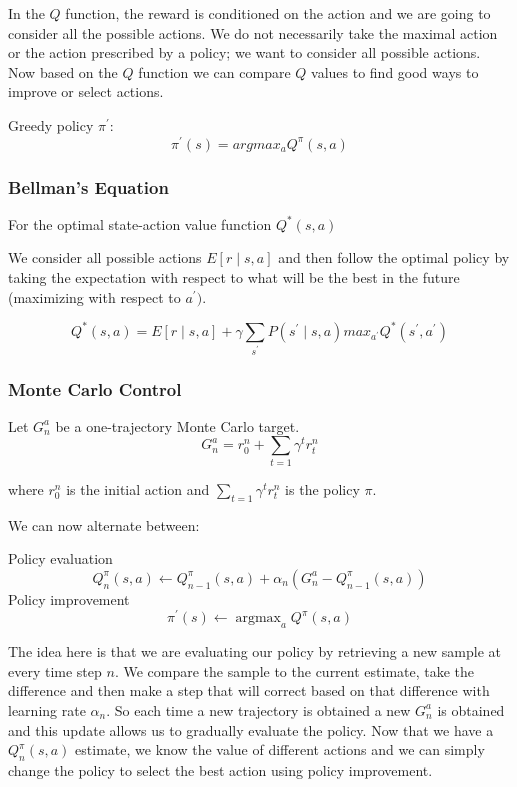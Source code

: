 \documentclass[12pt]{article}
\begin{document}
        In the $Q$ function, the reward is conditioned on the action and we are going to consider all the possible
        actions. We do not necessarily take the maximal action or the action prescribed by a policy; we want to consider
        all possible actions. Now based on the $Q$ function we can compare $Q$ values to find good ways to improve or
        select actions. 

        Greedy policy $\pi^{\prime}$:
        $$ \pi^{\prime}(s) = argmax_a Q^{\pi}(s,a) $$

        \subsubsection{Bellman's Equation}
            For the optimal state-action value function $Q^*(s, a)$ 

            We consider all possible actions $E[r \mid s, a]$ and then follow the optimal policy by taking the
            expectation with respect to what will be the best in the future (maximizing with respect to $a^{\prime})$.

            $$ Q^*(s, a) = E[r \mid s, a] + \gamma \sum_{s^{\prime}} P(s^{\prime} \mid s, a) max_{a^{\prime}}
            Q^*(s^{\prime}, a^{\prime}) $$
        
        \subsubsection{Monte Carlo Control}
            Let $G^a_n$ be a one-trajectory Monte Carlo target.
            $$ G^a_n = r_0^n + \sum_{t=1} \gamma^t r_t^n $$

            where $r_0^n$ is the initial action and $\sum_{t=1} \gamma^t r_t^n$ is the policy $\pi$.

            We can now alternate between:

            Policy evaluation
            $$ Q_{n}^{\pi}(s, a) \leftarrow Q_{n-1}^{\pi}(s, a)+\alpha_{n}\left(G_{n}^{a}-Q_{n-1}^{\pi}(s, a)\right) $$
            Policy improvement
            $$ \pi^{\prime}(s) \leftarrow \operatorname{argmax}_{a} Q^{\pi}(s, a) $$

            The idea here is that we are evaluating our policy by retrieving a new sample at every time step $n$. We
            compare the sample to the current estimate, take the difference and then make a step that will correct based
            on that difference with learning rate $\alpha_n$. So each time a new trajectory is obtained a new $G_n^a$ is
            obtained and this update allows us to gradually evaluate the policy. Now that we have a $Q^{\pi}_n(s,a)$
            estimate, we know the value of different actions and we can simply change the policy to select the best
            action using policy improvement.
\end{document}
